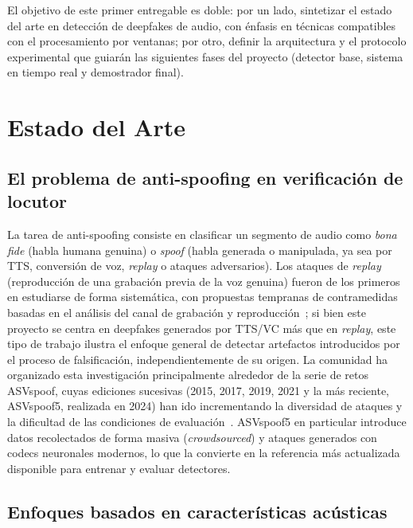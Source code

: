 \documentclass[conference]{IEEEtran}
\begin{document}
El objetivo de este primer entregable es doble: por un lado, sintetizar el estado del arte en detección de deepfakes de audio, con énfasis en técnicas compatibles con el procesamiento por ventanas; por otro, definir la arquitectura y el protocolo experimental que guiarán las siguientes fases del proyecto (detector base, sistema en tiempo real y demostrador final).

\section{Estado del Arte}

\subsection{El problema de anti-spoofing en verificación de locutor}

La tarea de anti-spoofing consiste en clasificar un segmento de audio como \emph{bona fide} (habla humana genuina) o \emph{spoof} (habla generada o manipulada, ya sea por TTS, conversión de voz, \emph{replay} o ataques adversarios). Los ataques de \emph{replay} (reproducción de una grabación previa de la voz genuina) fueron de los primeros en estudiarse de forma sistemática, con propuestas tempranas de contramedidas basadas en el análisis del canal de grabación y reproducción~\cite{villalba2011replay}; si bien este proyecto se centra en deepfakes generados por TTS/VC más que en \emph{replay}, este tipo de trabajo ilustra el enfoque general de detectar artefactos introducidos por el proceso de falsificación, independientemente de su origen. La comunidad ha organizado esta investigación principalmente alrededor de la serie de retos ASVspoof, cuyas ediciones sucesivas (2015, 2017, 2019, 2021 y la más reciente, ASVspoof5, realizada en 2024) han ido incrementando la diversidad de ataques y la dificultad de las condiciones de evaluación~\cite{asvspoof5}. ASVspoof5 en particular introduce datos recolectados de forma masiva (\emph{crowdsourced}) y ataques generados con codecs neuronales modernos, lo que la convierte en la referencia más actualizada disponible para entrenar y evaluar detectores.

\subsection{Enfoques basados en características acústicas}
\end{document}
